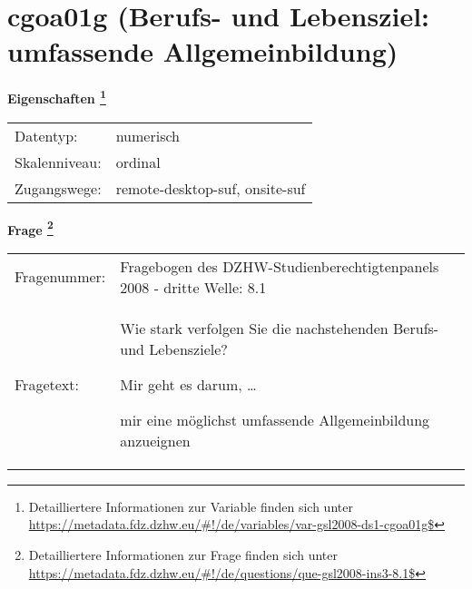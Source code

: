 
    \setcounter{footnote}{0}

    \vspace*{-1.8cm}
	\section{cgoa01g (Berufs- und Lebensziel: umfassende Allgemeinbildung)}
	\label{section:cgoa01g}



    \vspace*{0.5cm}
    \noindent\textbf{Eigenschaften
	\footnote{Detailliertere Informationen zur Variable finden sich unter
		\url{https://metadata.fdz.dzhw.eu/\#!/de/variables/var-gsl2008-ds1-cgoa01g$}}}\\
	\begin{tabularx}{\hsize}{@{}lX}
	Datentyp: & numerisch \\
	Skalenniveau: & ordinal \\
	Zugangswege: &
	  remote-desktop-suf, 
	  onsite-suf
 \\
    \end{tabularx}



				\vspace*{0.5cm}
                \noindent\textbf{Frage
	                \footnote{Detailliertere Informationen zur Frage finden sich unter
		              \url{https://metadata.fdz.dzhw.eu/\#!/de/questions/que-gsl2008-ins3-8.1$}}}\\
				\begin{tabularx}{\hsize}{@{}lX}
					Fragenummer: &
					  Fragebogen des DZHW-Studienberechtigtenpanels 2008 - dritte Welle:
					  8.1
 \\
					Fragetext: & Wie stark verfolgen Sie die nachstehenden Berufs- und Lebensziele?\par  Mir geht es darum, …\par  mir eine möglichst umfassende Allgemeinbildung anzueignen \\
				\end{tabularx}





